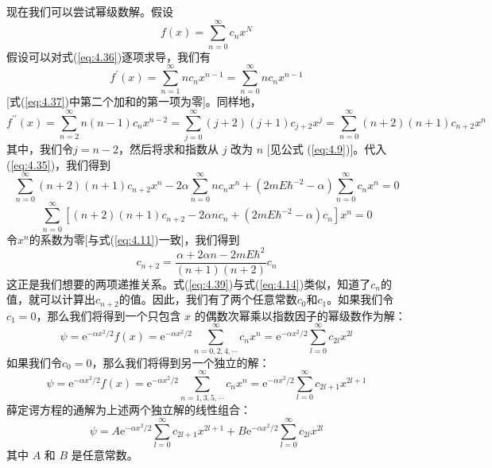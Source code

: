     现在我们可以尝试幂级数解。假设
    \begin{equation}
        f\left(x\right) = \sum_{n=0}^{\infty}c_nx^N
        \label{eq:4.36}
    \end{equation}
    假设可以对式(\ref{eq:4.36})逐项求导，我们有
    \begin{equation}
        f^{\prime}\left(x\right) = \sum_{n=1}^{\infty}nc_nx^{n-1} = \sum_{n=0}^{\infty}nc_nx^{n-1}
        \label{eq:4.37}
    \end{equation}
    [式(\ref{eq:4.37})中第二个加和的第一项为零]。同样地，
    \begin{equation*}
        f^{\prime\prime}\left(x\right) = \sum_{n=2}^{\infty}n(n-1)c_nx^{n-2} = \sum_{j=0}^{\infty}(j+2)(j+1)c_{j+2}x^{j} = \sum_{n=0}^{\infty}(n+2)(n+1)c_{n+2}x^{n}
    \end{equation*}
    其中，我们令$j = n - 2$，然后将求和指数从 $j$ 改为 $n$ [见公式 (\ref{eq:4.9})]。代入 (\ref{eq:4.35})，我们得到
    \begin{equation*}
        \sum_{n=0}^{\infty}\left(n+2\right)\left(n+1\right)c_{n+2}x^n - 2\alpha \sum_{n=0}^{\infty}n c_n x^n + \left(2mE\hbar^{-2} - \alpha\right)\sum_{n=0}^{\infty}c_nx^n = 0
    \end{equation*}
    \begin{equation}
        \sum_{n=0}^{\infty}\left[(n+2)(n+1)c_{n+2} - 2\alpha n c_n + \left(2mE\hbar^{-2} - \alpha\right)c_n\right]x^n = 0
        \label{eq:4.38}
    \end{equation}
    令$x^n$的系数为零[与式(\ref{eq:4.11})一致]，我们得到
    \begin{equation}
        c_{n+2} = \frac{\alpha + 2\alpha n - 2mE\hbar^2}{(n+1)(n+2)}c_n
        \label{eq:4.39}
    \end{equation}
    这正是我们想要的两项递推关系。式(\ref{eq:4.39})与式(\ref{eq:4.14})类似，知道了$c_n$的值，就可以计算出$c_{n+2}$的值。因此，我们有了两个任意常数$c_0$和$c_1$。如果我们令$c_1=0$，那么我们将得到一个只包含 $x$ 的偶数次幂乘以指数因子的幂级数作为解：
    \begin{equation}
        \psi = \mathrm{e}^{-\alpha x^2/2}f\left(x\right) = \mathrm{e}^{-\alpha x^2/2}\sum_{n=0,2,4,\cdots}^{\infty}c_{n}x^{n} = \mathrm{e}^{-\alpha x^2/2}\sum_{l=0}^{\infty}c_{2l}x^{2l}
        \label{eq:4.40}
    \end{equation}
    如果我们令$c_0=0$，那么我们将得到另一个独立的解：
    \begin{equation}
        \psi = \mathrm{e}^{-\alpha x^2/2}f\left(x\right) = \mathrm{e}^{-\alpha x^2/2}\sum_{n=1,3,5,\cdots}^{\infty}c_{n}x^{n} = \mathrm{e}^{-\alpha x^2/2}\sum_{l=0}^{\infty}c_{2l+1}x^{2l+1}
        \label{eq:4.41}
    \end{equation}
    薛定谔方程的通解为上述两个独立解的线性组合：
    \begin{equation}
        \psi = A\mathrm{e}^{-\alpha x^2/2}\sum_{l=0}^{\infty}c_{2l+1}x^{2l+1} + B\mathrm{e}^{-\alpha x^2/2}\sum_{l=0}^{\infty}c_{2l}x^{2l}
        \label{eq:4.42}
    \end{equation}
    其中 $A$ 和 $B$ 是任意常数。

